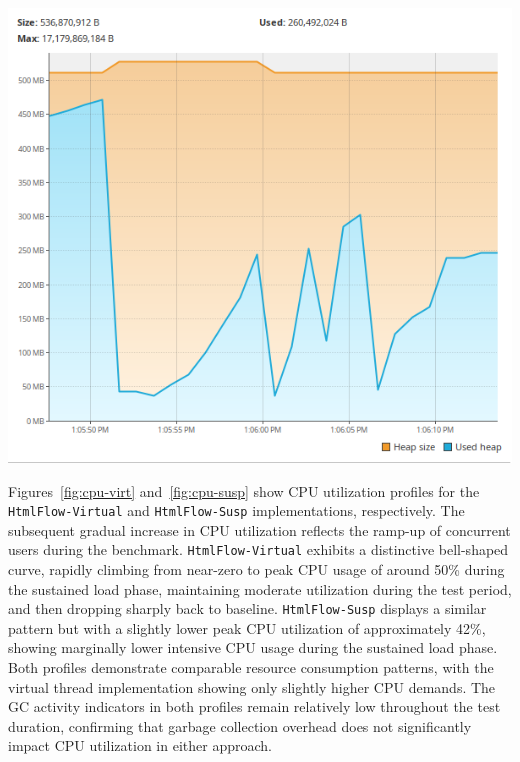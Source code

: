 \begin{center}
\begin{minipage}[t]{0.48\textwidth}
          \includegraphics[width=1.0\textwidth,height=1.0\textwidth]{./Graphs/mem-virt.png}
          \label{fig:gc-virt}
     \end{minipage}
\end{center}

Figures~\ref{fig:cpu-virt} and~\ref{fig:cpu-susp} show CPU utilization profiles
for the \texttt{HtmlFlow-Virtual} and \texttt{HtmlFlow-Susp} implementations,
respectively. The subsequent gradual increase in CPU utilization reflects the
ramp-up of concurrent users during the benchmark. \texttt{HtmlFlow-Virtual}
exhibits a distinctive bell-shaped curve, rapidly climbing from near-zero to
peak CPU usage of around 50\% during the sustained load phase, maintaining
moderate utilization during the test period, and then dropping sharply back to
baseline. \texttt{HtmlFlow-Susp} displays a similar pattern but with a slightly
lower peak CPU utilization of approximately 42\%, showing marginally lower
intensive CPU usage during the sustained load phase. Both profiles demonstrate
comparable resource consumption patterns, with the virtual thread
implementation showing only slightly higher CPU demands. The GC activity
indicators in both profiles remain relatively low throughout the test duration,
confirming that garbage collection overhead does not significantly impact CPU
utilization in either approach.

